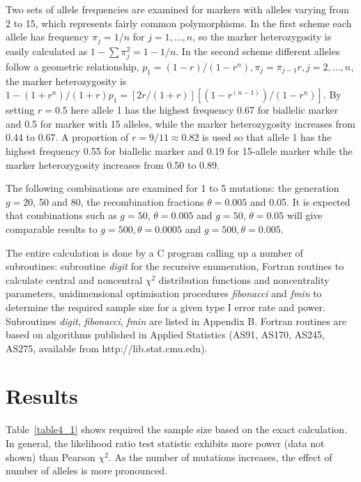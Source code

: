 Two sets of allele frequencies are examined for markers with alleles varying
from 2 to 15, which represents fairly common polymorphisms.  In the first
scheme each allele has frequency $\pi_j=1/n$ for $j=1, \ldots, n$, so the
marker heterozygosity is easily calculated as $1-\sum \pi_j^2=1-1/n$.  In the
second scheme different alleles follow a geometric relationship,
$p_1=(1-r)/(1-r^n), \pi_j=\pi_{j-1}r, j=2, \ldots, n$, the marker
heterozygosity is $1-(1+r^n)/(1+r)p_1=[2r/(1+r)][(1-r^{(n-1)})/(1-r^n)]$.  By
setting $r=0.5$ here allele 1 has the highest frequency 0.67 for biallelic
marker and 0.5 for marker with 15 alleles, while the marker heterozygosity
increases from 0.44 to 0.67.  A proportion of $r=9/11\approx 0.82$ is used so
that allele 1 has the highest frequency 0.55 for biallelic marker and 0.19 for
15-allele marker while the marker heterozygosity increases from 0.50 to 0.89.

The following combinations are examined for 1 to 5 mutations:  the generation
$g=20$, 50 and 80, the recombination fractions $\theta=0.005$ and 0.05.  It is
expected that combinations such as $g=50$, $\theta=0.005$ and $g=50$,
$\theta=0.05$ will give comparable results to $g=500,\theta=0.0005$ and $g=500,
\theta=0.005$.

The entire calculation is done by a C program calling up a number of
subroutines:  subroutine {\em digit} for the recursive enumeration, Fortran
routines to calculate central and noncentral $\chi^2$ distribution functions
and noncentrality parameters, unidimensional optimisation procedures {\em
fibonacci} and {\em fmin} to determine the required sample size for a given
type I error rate and power.  Subroutines {\em digit}, {\em fibonacci}, {\em
fmin} are listed in Appendix B.  Fortran routines are based on algorithms
published in Applied Statistics (AS91, AS170, AS245, AS275, available from
http://lib.stat.cmu.edu).


\section{Results}

Table~\ref{table4_1} shows required the sample size based on the exact
calculation.  In general, the likelihood ratio test statistic exhibits more
power (data not shown) than Pearson $\chi^2$.  As the number of mutations
increases, the effect of number of alleles is more pronounced.

